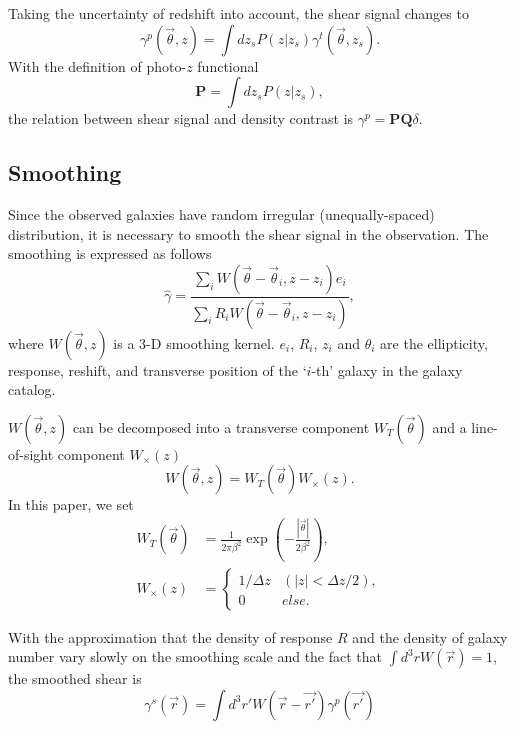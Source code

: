 \documentclass[twocolumn]{aastex62}
\begin{document}
Taking the uncertainty of redshift into account, the shear signal changes to
\begin{equation}\label{eq-delta2gamma-poz}
\gamma^p(\vec{\theta},z) = \int dz_s P(z|z_s) \gamma^t(\vec{\theta},z_s).
\end{equation}
With the definition of photo-$z$ functional
\begin{equation}
\mathbf{P} = \int dz_s P(z|z_s),
\end{equation}
the relation between shear signal and density contrast is $\gamma^p=\mathbf{P} \mathbf{Q} \delta$.

\subsection{Smoothing}
\label{subsec:method-smoothing}

Since the observed galaxies have random irregular (unequally-spaced) distribution, it is necessary to smooth 
the shear signal in the observation. The smoothing is expressed as follows
\begin{equation}
\hat{\gamma}  = \frac{\sum_i  W(\vec{\theta}-\vec{{\theta}}_i,z-z_i) e_i}{\sum_i R_i W(\vec{\theta}-\vec{{\theta}}_i,z-z_i) },
\end{equation}
where $W(\vec{\theta},z)$ is a $3$-D smoothing kernel. $e_i$, $R_i$, $z_i$ and $\theta_i$ are the ellipticity, 
response, reshift, and transverse position of the `$i$-th' galaxy in the galaxy catalog.

$W(\vec{\theta},z)$ can be decomposed into a transverse component $W_T(\vec{\theta})$ and a line-of-sight component 
$W_\times(z)$
\begin{equation}
W(\vec{\theta},z)=W_T(\vec{\theta}) W_\times (z).
\end{equation}
In this paper, we set
\begin{equation}
\begin{split}
W_T(\vec{\theta}) &=\frac{1}{2\pi\beta^2}\exp(-\frac{|\vec{\theta}|}{2\beta^2}),\\
W_\times (z) &=
\begin{cases}
1/\Delta z& (|z|<\Delta z/2),\\
0& else.
\end{cases}
\end{split}
\end{equation}

With the approximation that the density of response $R$ and the density of galaxy number vary slowly on the smoothing scale
and the fact that $\int d^3r W(\vec{r})=1$, the smoothed shear is
\begin{equation}\label{eq-smooth-gamma}
\gamma^s(\vec{r})= \int d^3 r' W(\vec{r}-\vec{r'}) \gamma^p(\vec{r'})
\end{equation}
\end{document}
